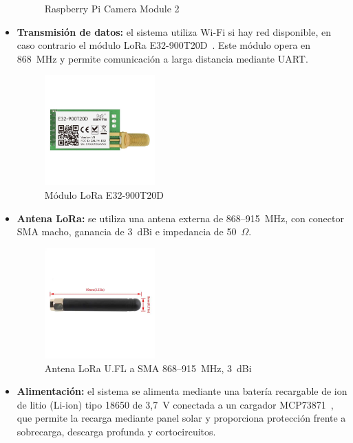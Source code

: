 \begin{itemize}
\begin{figure}[h]
        \caption{Raspberry Pi Camera Module 2}
        \label{fig:rascamv2}
    \end{figure}
    \item \textbf{Transmisión de datos:} el sistema utiliza Wi-Fi si hay red disponible, en caso contrario el módulo LoRa E32-900T20D~\cite{ebyteE32}.
    Este módulo opera en 868~MHz y permite comunicación a larga distancia mediante UART.
    \begin{figure}[h]
        \centering
        \includegraphics[width=0.4\textwidth]{Imagenes/Bitmap/lorae32}
        \caption{Módulo LoRa E32-900T20D}
        \label{fig:lorae32}
    \end{figure}

    \item \textbf{Antena LoRa:} se utiliza una antena externa de 868–915~MHz, con conector SMA macho, ganancia de 3~dBi e impedancia de 50~\(\Omega\).

    \begin{figure}[h]
        \centering
        \includegraphics[width=0.4\textwidth]{Imagenes/Bitmap/antena_lora}
        \caption{Antena LoRa U.FL a SMA 868–915~MHz, 3~dBi}
        \label{fig:antena_lora}
    \end{figure}

    \item \textbf{Alimentación:} el sistema se alimenta mediante una batería recargable de ion de litio (Li-ion) tipo 18650 de 3{,}7~V conectada a un cargador MCP73871~\cite{mcp73871Datasheet}, que permite la recarga mediante panel solar y proporciona protección frente a sobrecarga, descarga profunda y cortocircuitos.


\end{itemize}
